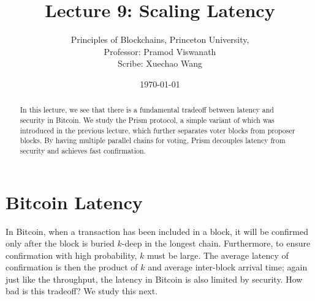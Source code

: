 \documentclass{article}
\title{Lecture 9:  Scaling Latency}
\author{Principles of Blockchains, Princeton University,  \\ Professor:  Pramod Viswanath \\ Scribe:  Xuechao Wang}
\date{\today}
\begin{document}
\maketitle

\begin{abstract}
In this lecture, we see that there is a fundamental tradeoff between latency and security in {\sf  Bitcoin}.  We study  the {\sf  Prism} protocol, a simple variant of which was introduced in the previous lecture,  which further separates voter blocks from proposer blocks. By having multiple parallel chains for voting, {\sf Prism} decouples latency from security and achieves fast confirmation.
\end{abstract}

\section*{Bitcoin Latency}

In {\sf Bitcoin}, when a transaction has been included in a block, it will be confirmed only after the block is buried $k$-deep in the longest chain. Furthermore, to ensure confirmation with high probability, $k$ must be large. The average latency of confirmation is then the product of $k$ and average inter-block arrival time;  again just like the throughput, the latency in {\sf Bitcoin} is also limited by security. How bad is this tradeoff? We study this next. 

\end{document}
